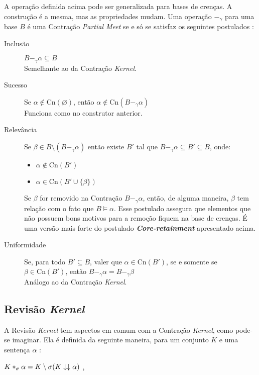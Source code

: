 A operação definida acima pode ser generalizada para bases de crenças. A construção é a mesma, mas as propriedades mudam. Uma operação $ -_{\gamma} $ para uma base $ B $ é uma Contração \textit{Partial Meet} se e só se satisfaz os seguintes postulados \citep{revisaoHansson2}:

\begin{description}
	\item[Inclusão] $ B -_{\gamma} \alpha \subseteq B$ \\ Semelhante ao da Contração \textit{Kernel}.
	\item[Sucesso] Se $ \alpha \notin \text{Cn}(\varnothing) $, então $ \alpha \notin \text{Cn}(B -_{\gamma} \alpha) $ \\ Funciona como no construtor anterior.
	\item[Relevância] Se $ \beta \in B \setminus (B -_{\gamma} \alpha) $ então existe  $ B' $ tal que $B -_{\gamma} \alpha \subseteq B' \subseteq B $, onde:
	\begin{itemize}
		\item $ \alpha \notin \text{Cn}(B') $
		\item $ \alpha \in \text{Cn}(B' \cup \{\beta\}) $ 
	\end{itemize}
	Se $ \beta $ for removido na Contração $ B -_{\gamma} \alpha $, então, de alguma maneira, $ \beta $ tem relação com o fato que $ B \models \alpha$. Esse postulado assegura que elementos que não possuem bons motivos para a remoção fiquem na base de crenças. É uma versão mais forte do postulado \textbf{\textit{Core-retainment}} apresentado acima.
	\item[Uniformidade] Se, para todo $B' \subseteq B $, valer que $ \alpha \in \text{Cn}(B') $, se e somente se $ \beta \in \text{Cn}(B') $, então $ B -_{\gamma} \alpha = B -_{\gamma} \beta $ \\
	Análogo ao da Contração \textit{Kernel}. 
	
\end{description}

\subsection{Revisão \textit{Kernel}}

A Revisão \textit{Kernel} tem aspectos em comum com a Contração \textit{Kernel}, como pode-se imaginar. Ela é definida da seguinte maneira, para um conjunto $ K $ e uma sentença $ \alpha $ \citep{revisaoRibeiro2}:

\begin{center}
	$ K \ast_\sigma \alpha = K \setminus \sigma (K \downarrow\downarrow \alpha)$ ,
\end{center}

